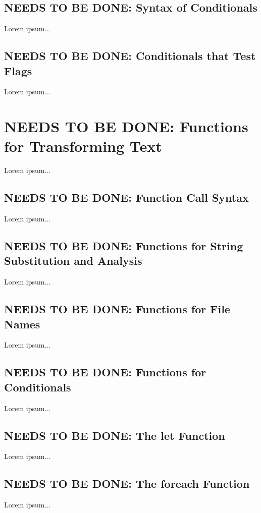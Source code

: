\documentclass{charun}
\begin{document}
\begin{multicols*}{2}
\color{gray}
\subsection{NEEDS TO BE DONE: Syntax of Conditionals}
Lorem ipsum...
\color{black}

\color{gray}
\subsection{NEEDS TO BE DONE: Conditionals that Test Flags}
Lorem ipsum...
\color{black}


\color{gray}
\section{NEEDS TO BE DONE: Functions for Transforming Text}
Lorem ipsum...
\color{black}


\color{gray}
\subsection{NEEDS TO BE DONE: Function Call Syntax}
Lorem ipsum...
\color{black}

\color{gray}
\subsection{NEEDS TO BE DONE: Functions for String Substitution and Analysis}
Lorem ipsum...
\color{black}

\color{gray}
\subsection{NEEDS TO BE DONE: Functions for File Names}
Lorem ipsum...
\color{black}

\color{gray}
\subsection{NEEDS TO BE DONE: Functions for Conditionals}
Lorem ipsum...
\color{black}

\color{gray}
\subsection{NEEDS TO BE DONE: The let Function}
Lorem ipsum...
\color{black}

\color{gray}
\subsection{NEEDS TO BE DONE: The foreach Function}
Lorem ipsum...
\color{black}


\end{multicols*}
\end{document}

